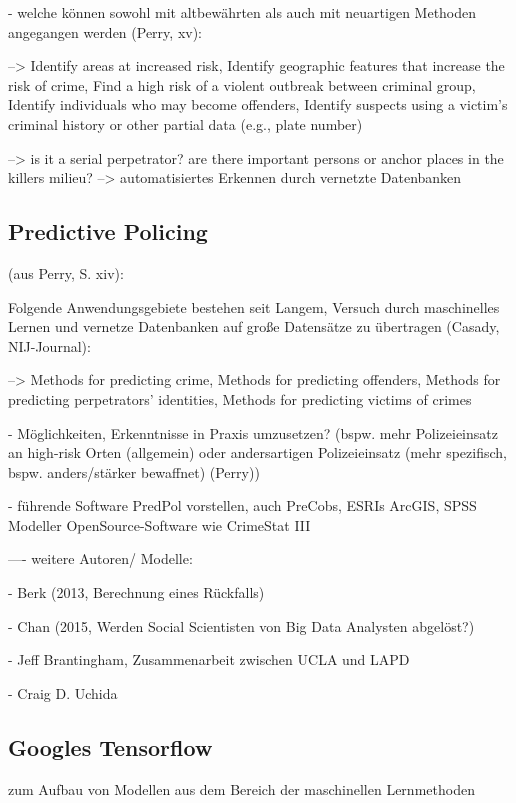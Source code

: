 \documentclass[a4paper,12pt,parskip,bibtotoc,liststotoc]{article}
\begin{document}
- welche können sowohl mit altbewährten als auch mit neuartigen Methoden angegangen werden (Perry, xv):

--> Identify areas at increased risk, Identify geographic features that increase the risk of crime, Find a high risk of a violent outbreak between criminal group, Identify individuals who may become offenders,
Identify suspects using a victim’s criminal history or other partial data (e.g., plate number) 

--> is it a serial perpetrator? are there important persons or anchor places in the killers milieu? --> automatisiertes Erkennen durch vernetzte Datenbanken\\


\subsection{Predictive Policing}  

(aus Perry, S. xiv):

Folgende Anwendungsgebiete bestehen seit Langem, Versuch durch maschinelles Lernen und vernetze Datenbanken auf große Datensätze zu übertragen (Casady, NIJ-Journal): 

--> Methods for predicting crime, Methods for predicting offenders, Methods for predicting perpetrators’ identities, Methods for predicting victims of crimes

- Möglichkeiten, Erkenntnisse in Praxis umzusetzen? (bspw. mehr Polizeieinsatz an high-risk Orten (allgemein) oder andersartigen Polizeieinsatz (mehr spezifisch, bspw. anders/stärker bewaffnet) (Perry))

- führende Software PredPol vorstellen, auch PreCobs, ESRIs ArcGIS, SPSS Modeller OpenSource-Software wie CrimeStat III



---- weitere Autoren/ Modelle: 

- Berk (2013, Berechnung eines Rückfalls)

- Chan (2015, Werden Social Scientisten von Big Data Analysten abgelöst?)

- Jeff Brantingham, Zusammenarbeit zwischen UCLA und LAPD

- Craig D. Uchida\\ 


\subsection{Googles Tensorflow}  

zum Aufbau von Modellen aus dem Bereich der maschinellen Lernmethoden\\
\end{document}
